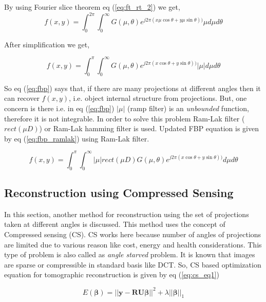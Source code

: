 \documentclass[twoside]{iitbreport}
\begin{document}
By using Fourier slice theorem eq (\ref{eq:ft_rt_2}) we get,
\begin{equation}
f(x,y) = \int_{0}^{2\pi} \int_{0}^{\infty} G(\mu,\theta) e^{j2\pi(x\mu\cos\theta+y\mu\sin\theta))} \mu d\mu d\theta
\end{equation}

After simplification we get,

\begin{equation}\label{eq:fbp}
f(x,y) = \int_{0}^{\pi} \int_{0}^{\infty} G(\mu,\theta) e^{j2\pi(x\cos\theta+y\sin\theta))} |\mu| d\mu d\theta
\end{equation}

\noindent
So eq (\ref{eq:fbp}) says that, if there are many projections at different angles then it can recover $f(x,y)$, i.e. object internal structure from projections. But, one concern is there i.e. in eq (\ref{eq:fbp}) $|\mu|$ (ramp filter) is an \textit{unbounded} function, therefore it is not integrable. In order to solve this problem Ram-Lak filter ($rect(\mu D)$) or Ram-Lak hamming filter is used. Updated FBP equation is given by eq (\ref{eq:fbp_ramlak}) using Ram-Lak filter.


\begin{equation}\label{eq:fbp_ramlak}
f(x,y) = \int_{0}^{\pi} \int_{0}^{\infty} |\mu| rect(\mu D) G(\mu,\theta) e^{j2\pi(x\cos\theta+y\sin\theta))}  d\mu d\theta
\end{equation}


\subsection{Reconstruction using Compressed Sensing}\label{subsec:reconst_cs}
In this section, another method for reconstruction using the set of projections taken at different angles is discussed. This method uses the concept of Compressed sensing (CS). CS works here because number of angles of projections are limited due to various reason like cost, energy and health considerations. This type of problem is also called as \textit{angle starved} problem. It is known that images are sparse or compressible in standard basis like DCT. So, CS based optimization equation for tomographic reconstruction is given by eq (\ref{eq:cs_eq1})

\begin{equation}\label{eq:cs_eq1}
E(\boldsymbol{\beta}) =  ||\boldsymbol{y - RU\beta}||^2 +\lambda||\boldsymbol{\beta}||_1
\end{equation}
\end{document}

